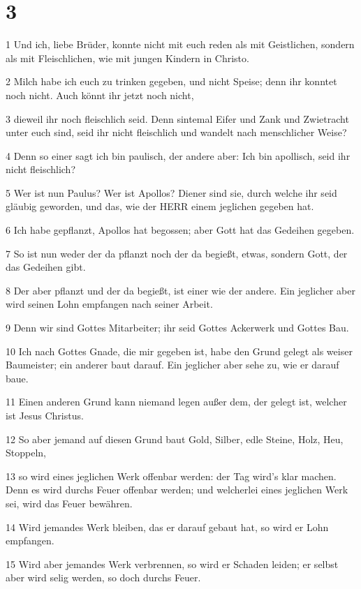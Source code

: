 \chapter{3}

\par 1 Und ich, liebe Brüder, konnte nicht mit euch reden als mit Geistlichen, sondern als mit Fleischlichen, wie mit jungen Kindern in Christo.
\par 2 Milch habe ich euch zu trinken gegeben, und nicht Speise; denn ihr konntet noch nicht. Auch könnt ihr jetzt noch nicht,
\par 3 dieweil ihr noch fleischlich seid. Denn sintemal Eifer und Zank und Zwietracht unter euch sind, seid ihr nicht fleischlich und wandelt nach menschlicher Weise?
\par 4 Denn so einer sagt ich bin paulisch, der andere aber: Ich bin apollisch, seid ihr nicht fleischlich?
\par 5 Wer ist nun Paulus? Wer ist Apollos? Diener sind sie, durch welche ihr seid gläubig geworden, und das, wie der HERR einem jeglichen gegeben hat.
\par 6 Ich habe gepflanzt, Apollos hat begossen; aber Gott hat das Gedeihen gegeben.
\par 7 So ist nun weder der da pflanzt noch der da begießt, etwas, sondern Gott, der das Gedeihen gibt.
\par 8 Der aber pflanzt und der da begießt, ist einer wie der andere. Ein jeglicher aber wird seinen Lohn empfangen nach seiner Arbeit.
\par 9 Denn wir sind Gottes Mitarbeiter; ihr seid Gottes Ackerwerk und Gottes Bau.
\par 10 Ich nach Gottes Gnade, die mir gegeben ist, habe den Grund gelegt als weiser Baumeister; ein anderer baut darauf. Ein jeglicher aber sehe zu, wie er darauf baue.
\par 11 Einen anderen Grund kann niemand legen außer dem, der gelegt ist, welcher ist Jesus Christus.
\par 12 So aber jemand auf diesen Grund baut Gold, Silber, edle Steine, Holz, Heu, Stoppeln,
\par 13 so wird eines jeglichen Werk offenbar werden: der Tag wird's klar machen. Denn es wird durchs Feuer offenbar werden; und welcherlei eines jeglichen Werk sei, wird das Feuer bewähren.
\par 14 Wird jemandes Werk bleiben, das er darauf gebaut hat, so wird er Lohn empfangen.
\par 15 Wird aber jemandes Werk verbrennen, so wird er Schaden leiden; er selbst aber wird selig werden, so doch durchs Feuer.
